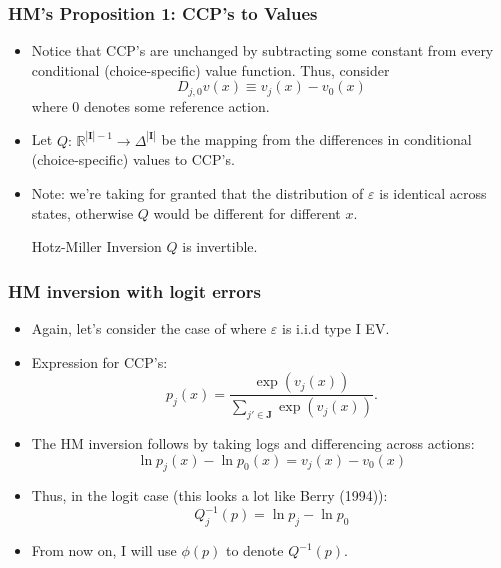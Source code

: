\documentclass[xcolor=pdftex,dvipsnames,table,mathserif,aspectratio=169]{beamer}
\begin{document}
\begin{frame}
\frametitle{HM's Proposition 1: CCP's to Values}
\begin{itemize}
	\item Notice that CCP's are unchanged by subtracting some constant from every conditional (choice-specific) value function. Thus, consider\[
	D_{j,0} v\left(x\right) \equiv v_{j}\left(x\right) - v_{0}\left(x\right)
	\]
	where $0$ denotes some reference action.
	
	\medskip
	\item Let $Q:\, \mathbb{R}^{\left| \mathbf{I}\right|-1} \rightarrow \Delta^{\left| \mathbf{I}\right|}$ be the mapping
	from the differences in conditional (choice-specific) values to CCP's.

	\medskip
	\item Note: we're taking for granted that the distribution of $\varepsilon$ is identical across states, otherwise
	$Q$ would be different for different $x$.

	\begin{block}{Hotz-Miller Inversion}
	$Q$ is invertible.
	\end{block}

\end{itemize}
\end{frame}

\begin{frame}
\frametitle{HM inversion with logit errors}
\begin{itemize}
	\item Again, let's consider the case of where $\varepsilon$ is i.i.d type I EV.

	\smallskip
	\item Expression for CCP's: \[
	p_{j}\left(x\right) = \frac{\exp\left(v_{j}\left(x\right)\right)}{\sum_{j'\in \mathbf{J}}\exp\left(v_{j}\left(x\right)\right)}.
	\]

	\smallskip
	\item The HM inversion follows by taking logs and differencing across actions: \[
		\ln p_{j}\left(x\right) - \ln p_{0}\left(x\right) = v_{j}\left(x\right) - v_{0}\left(x\right)
	\]

	\smallskip
	\item Thus, in the logit case (this looks a lot like Berry (1994)):
	\[
	Q_{j}^{-1} \left( p \right) = \ln p_{j} - \ln p_{0}
	\]

	\smallskip
	\item From now on, I will use $\phi(p)$ to denote $Q^{-1}(p)$.

\end{itemize}
\end{frame}
\end{document}
